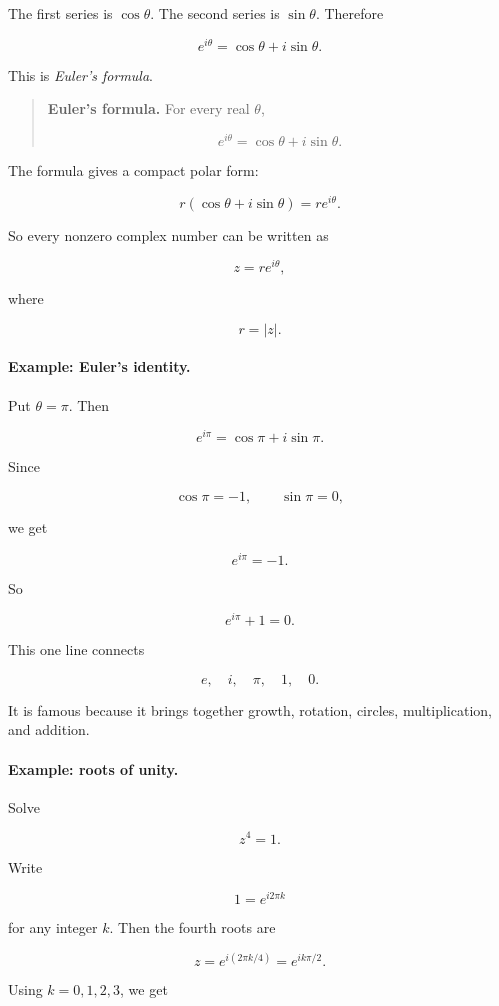 The first series is \(\cos\theta\).  The second series is \(\sin\theta\).  Therefore

\[
\boxed{
e^{i\theta}=\cos\theta+i\sin\theta.
}
\]

This is \emph{Euler's formula}.

\begin{quote}
\textbf{Euler's formula.}
For every real \(\theta\),

\[
\boxed{
e^{i\theta}=\cos\theta+i\sin\theta.
}
\]
\end{quote}

The formula gives a compact polar form:

\[
\boxed{
r(\cos\theta+i\sin\theta)=re^{i\theta}.
}
\]

So every nonzero complex number can be written as

\[
\boxed{
z=re^{i\theta},
}
\]

where

\[
r=|z|.
\]

\paragraph{Example: Euler's identity.}
Put \(\theta=\pi\).  Then

\[
e^{i\pi}=\cos\pi+i\sin\pi.
\]

Since

\[
\cos\pi=-1,
\qquad
\sin\pi=0,
\]

we get

\[
e^{i\pi}=-1.
\]

So

\[
\boxed{
e^{i\pi}+1=0.
}
\]

This one line connects

\[
e,\quad i,\quad \pi,\quad 1,\quad 0.
\]

It is famous because it brings together growth, rotation, circles, multiplication, and
addition.

\paragraph{Example: roots of unity.}
Solve

\[
z^4=1.
\]

Write

\[
1=e^{i2\pi k}
\]

for any integer \(k\).  Then the fourth roots are

\[
z=e^{i(2\pi k/4)}=e^{i k\pi/2}.
\]

Using \(k=0,1,2,3\), we get

